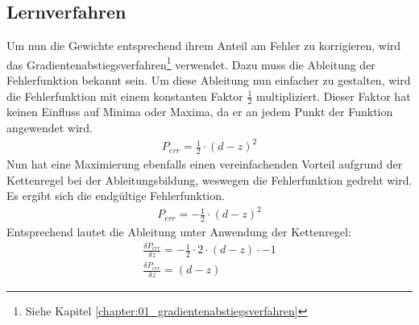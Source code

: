 \subsection{Lernverfahren}
Um nun die Gewichte entsprechend ihrem Anteil am Fehler zu korrigieren, wird das Gradientenabstiegsverfahren\footnote{Siehe Kapitel \ref{chapter:01_gradientenabstiegsverfahren}}
verwendet. Dazu muss die Ableitung der Fehlerfunktion bekannt sein. Um diese Ableitung nun einfacher zu gestalten,
wird die Fehlerfunktion mit einem konstanten Faktor $\frac{1}{2}$ multipliziert. Dieser Faktor hat keinen Einfluss
auf Minima oder Maxima, da er an jedem Punkt der Funktion angewendet wird.
\begin{align}
    P_{err} = \frac{1}{2} \cdot (d - z)^2
\end{align}
Nun hat eine Maximierung ebenfalls einen vereinfachenden Vorteil aufgrund der Kettenregel bei der Ableitungsbildung,
weswegen die Fehlerfunktion gedreht wird. Es ergibt sich die endgültige Fehlerfunktion.
\begin{align}
    P_{err} = -\frac{1}{2} \cdot (d - z)^2
\end{align}
Entsprechend lautet die Ableitung unter Anwendung der Kettenregel:
\begin{align}
    \frac{\delta P_{err}}{\delta z} = - \frac{1}{2} \cdot 2 \cdot (d - z) \cdot -1\\
    \frac{\delta P_{err}}{\delta z} = (d - z)
\end{align}

